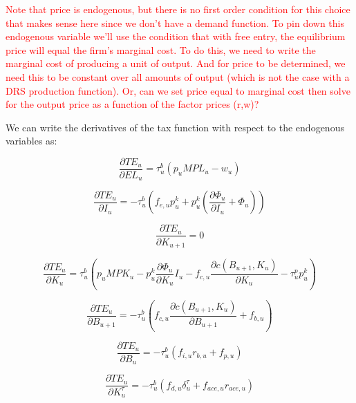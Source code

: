 \textcolor{red}{Note that price is endogenous, but there is no first order condition for this choice that makes sense here since we don't have a demand function.  To pin down this endogenous variable we'll use the condition that with free entry, the equilibrium price will equal the firm's marginal cost. To do this, we need to write the marginal cost of producing a unit of output.  And for price to be determined, we need this to be constant over all amounts of output (which is not the case with a DRS production function).  Or, can we set price equal to marginal cost then solve for the output price as a function of the factor prices (r,w)? }

We can write the derivatives of the tax function with respect to the endogenous variables as:

\begin{equation}
\label{eqn:d_te_l}
\frac{\partial TE_{u}}{\partial EL_{u}}= \tau^{b}_{u}\left(p_{u}MPL_{u}- w_{u} \right)
\end{equation}

\begin{equation}
\label{eqn:d_te_i}
\frac{\partial TE_{u}}{\partial I_{u}}= -\tau^{b}_{u}\left(f_{e,u}p^{k}_{u} + p^{k}_{u}\left(\frac{\partial \Phi_{u}}{\partial I_{u}} + \Phi_{u}\right)\right)
\end{equation}

\begin{equation}
\label{eqn:d_te_kp1}
\frac{\partial TE_{u}}{\partial K_{u+1}}= 0
\end{equation}

\begin{equation}
\label{eqn:d_te_k}
\frac{\partial TE_{u}}{\partial K_{u}}= \tau^{b}_{u}\left( p_{u}MPK_{u} - p^{k}_{u}\frac{\partial \Phi_{u}}{\partial K_{u}}I_{u} - f_{c,u}\frac{\partial c(B_{u+1},K_{u})}{\partial K_{u}}- \tau^{p}_{u}p^{k}_{u}\right)
\end{equation}

\begin{equation}
\label{eqn:d_te_bp1}
\frac{\partial TE_{u}}{\partial B_{u+1}}= -\tau^{b}_{u}\left( f_{c,u}\frac{\partial c(B_{u+1},K_{u})}{\partial B_{u+1}} + f_{b,u}\right)
\end{equation}

\begin{equation}
\label{eqn:d_te_b}
\frac{\partial TE_{u}}{\partial B_{u}}= -\tau^{b}_{u}\left(f_{i,u}r_{b,u} + f_{p,u} \right)
\end{equation}

\begin{equation}
\label{eqn:d_te_b}
\frac{\partial TE_{u}}{\partial K^{\tau}_{u}}= -\tau^{b}_{u}\left(f_{d,u}\delta^{\tau}_{u}+f_{ace,u}r_{ace,u} \right)
\end{equation}


